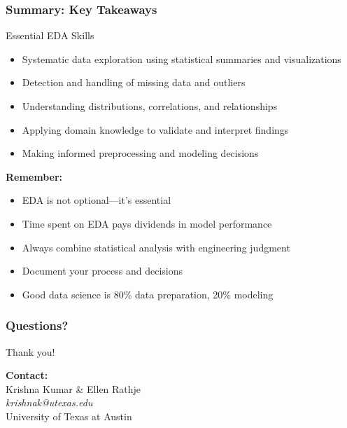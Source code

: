 \documentclass[aspectratio=169]{beamer}
\begin{document}
\begin{frame}
\frametitle{Summary: Key Takeaways}

\begin{block}{Essential EDA Skills}
\begin{itemize}
    \item Systematic data exploration using statistical summaries and visualizations
    \item Detection and handling of missing data and outliers
    \item Understanding distributions, correlations, and relationships
    \item Applying domain knowledge to validate and interpret findings
    \item Making informed preprocessing and modeling decisions
\end{itemize}
\end{block}

\vspace{0.5cm}

\textbf{Remember:}
\begin{itemize}
    \item EDA is not optional—it's essential
    \item Time spent on EDA pays dividends in model performance
    \item Always combine statistical analysis with engineering judgment
    \item Document your process and decisions
    \item Good data science is 80\% data preparation, 20\% modeling
\end{itemize}

\end{frame}

\begin{frame}
\frametitle{Questions?}

\centering
\Large Thank you!

\vspace{2cm}

\textbf{Contact:} \\
Krishna Kumar \& Ellen Rathje \\
\textit{krishnak@utexas.edu} \\
University of Texas at Austin

\vspace{1cm}

\href{https://colab.research.google.com/github/kks32-courses/ai-geotech/blob/main/docs/00-mlp-dtree/00-eda-liquefaction.ipynb}{}

\end{frame}
\end{document}
